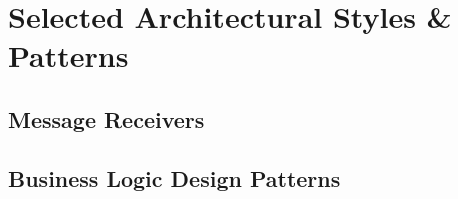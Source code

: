 \section{Selected Architectural Styles \& Patterns}

\subsection{Message Receivers}

\subsection{Business Logic Design Patterns}